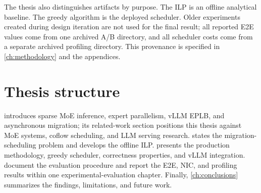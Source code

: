 The thesis also distinguishes artifacts by purpose. The ILP is an offline
analytical baseline. The greedy algorithm is the deployed scheduler. Older
experiments created during design iteration are not used for the final result;
all reported E2E values come from one archived A/B directory, and all scheduler
costs come from a separate archived profiling directory. This provenance is
specified in \cref{ch:methodology} and the appendices.

\section{Thesis structure}

 introduces sparse MoE inference, expert parallelism,
vLLM EPLB, and asynchronous migration; its related-work section positions this
thesis against MoE systems, coflow scheduling, and LLM serving research.
 states the migration-scheduling problem and develops the
offline ILP.  presents the production methodology, greedy
scheduler, correctness properties, and vLLM integration.
 document the evaluation procedure and report
the E2E, NIC, and profiling results within one experimental-evaluation chapter.
Finally, \cref{ch:conclusions} summarizes the findings, limitations, and future
work.
